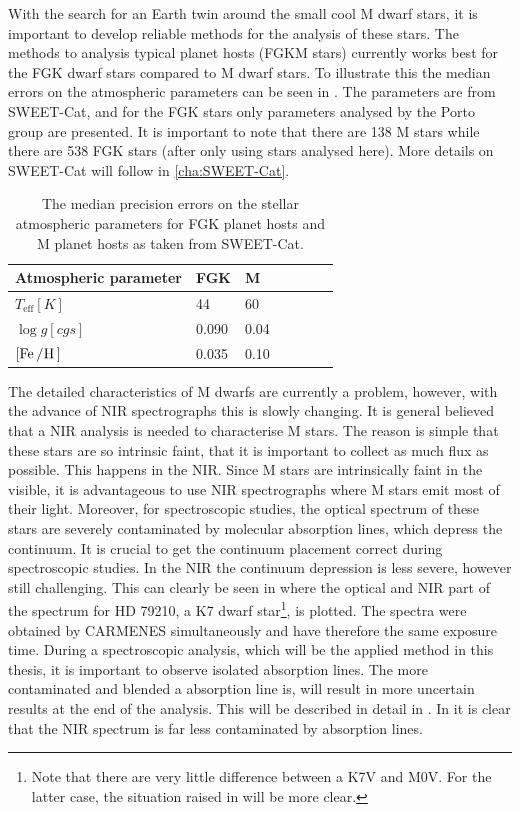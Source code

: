 With the search for an Earth twin around the small cool M dwarf stars, it is important to develop
reliable methods for the analysis of these stars. The methods to analysis typical planet hosts (FGKM
stars) currently works best for the FGK dwarf stars compared to M dwarf stars. To illustrate this
the median errors on the atmospheric parameters can be seen in . The
parameters are from SWEET-Cat, and for the FGK stars only parameters analysed by the Porto group are
presented. It is important to note that there are 138 M stars while there are 538 FGK stars (after
only using stars analysed here). More details on SWEET-Cat will follow in \cref{cha:SWEET-Cat}.
\begin{table}[htb!]
    \caption{The median precision errors on the stellar atmospheric parameters for FGK planet
             hosts and M planet hosts as taken from SWEET-Cat.}
    \label{tab:standardErrors}
    \centering
    \begin{tabular}{lllllll}
      \hline\hline
        Atmospheric parameter      & FGK    & M    \\
      \hline
        $T_\mathrm{eff} [\si{K}]$  & 44     & 60   \\
        $\log g [\si{cgs}]$        & 0.090  & 0.04 \\
        $[\ion{Fe}/\ion{H}]$       & 0.035  & 0.10 \\
      \hline
    \end{tabular}
\end{table}

The detailed characteristics of M dwarfs are currently a problem, however, with the advance of
NIR spectrographs this is slowly changing. It is general believed that a NIR analysis is needed to
characterise M stars. The reason is simple that these stars are so intrinsic faint, that it is
important to collect as much flux as possible. This happens in the NIR. Since M stars are
intrinsically faint in the visible, it is advantageous to use NIR spectrographs where M stars emit
most of their light. Moreover, for spectroscopic studies, the optical spectrum of these stars are
severely contaminated by molecular absorption lines, which depress the continuum. It is crucial to
get the continuum placement correct during spectroscopic studies. In the NIR the continuum
depression is less severe, however still challenging. This can clearly be seen in
 where the optical and NIR part of the spectrum for HD 79210, a K7 dwarf
star\footnote{Note that there are very little difference between a K7V and M0V. For the latter case,
the situation raised in  will be more clear.}, is plotted. The spectra were
obtained by CARMENES simultaneously and have therefore the same exposure time. During a
spectroscopic analysis, which will be the applied method in this thesis, it is important to observe
isolated absorption lines. The more contaminated and blended a absorption line is, will result in
more uncertain results at the end of the analysis. This will be described in detail in
. In  it is clear that the NIR spectrum is far less
contaminated by absorption lines.

